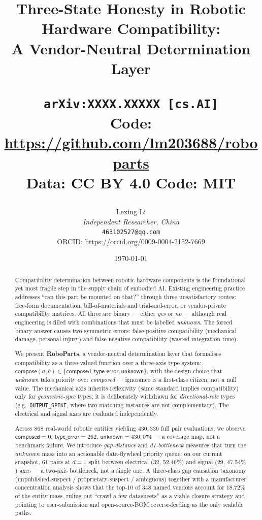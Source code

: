 \documentclass[11pt,twocolumn]{article}
\title{Three-State Honesty in Robotic Hardware Compatibility:\\
       A Vendor-Neutral Determination Layer
  \vspace{0.4cm}
  \begin{flushright}
    \footnotesize
    \texttt{arXiv:XXXX.XXXXX [cs.AI]} \\
    Code: \url{https://github.com/lm203688/roboparts} \\
    Data: CC BY 4.0 \quad Code: MIT
  \end{flushright}
}
\author{Lexing Li \\
\textit{Independent Researcher, China} \\
\texttt{463102527@qq.com} \\
ORCID: \url{https://orcid.org/0009-0004-2152-7669}}
\date{\today}
\begin{document}
\maketitle

\begin{abstract}
Compatibility determination between robotic hardware components is the
foundational yet most fragile step in the supply chain of embodied AI.
Existing engineering practice addresses ``can this part be mounted on
that?'' through three unsatisfactory routes: free-form documentation,
bill-of-materials and trial-and-error, or vendor-private compatibility
matrices. All three are binary --- either \emph{yes} or \emph{no} ---
although real engineering is filled with combinations that must be
labelled \emph{unknown}. The forced binary answer causes two symmetric
errors: false-positive compatibility (mechanical damage, personal
injury) and false-negative compatibility (wasted integration time).

We present \textbf{RoboParts}, a vendor-neutral determination layer
that formalises compatibility as a three-valued function over a
three-axis type system:
$\mathsf{compose}(a,b) \in \{\mathsf{composed}, \mathsf{type\_error}, \mathsf{unknown}\}$,
with the design choice that \emph{unknown} takes priority over
\emph{composed} --- ignorance is a first-class citizen, not a null value.
The mechanical axis inherits reflexivity (same standard implies
compatibility) only for \emph{geometric-spec} types; it is deliberately
withdrawn for \emph{directional-role} types (e.g.\ \texttt{OUTPUT\_SPIKE},
where two matching instances are not complementary). The electrical and
signal axes are evaluated independently.

Across $868$ real-world robotic entities yielding $430{,}336$ full
pair evaluations, we observe $\mathsf{composed}=0$,
$\mathsf{type\_error}=262$, $\mathsf{unknown}=430{,}074$ --- a coverage
map, not a benchmark failure. We introduce \emph{gap-distance} and
\emph{d1-bottleneck} measures that turn the $unknown$ mass into an
actionable data-flywheel priority queue: on our current snapshot,
$61$ pairs at $d=1$ split between electrical ($32$, $52.46\%$) and
signal ($29$, $47.54\%$) axes --- a two-axis bottleneck, not a single
one. A three-class gap causation taxonomy
(unpublished-suspect / proprietary-suspect / ambiguous) together with
a manufacturer concentration analysis shows that the top-$10$ of $348$
named vendors account for $18.72\%$ of the entity mass, ruling out
``crawl a few datasheets'' as a viable closure strategy and pointing
to user-submission and open-source-BOM reverse-feeding as the only
scalable paths.
\end{abstract}
\end{document}
